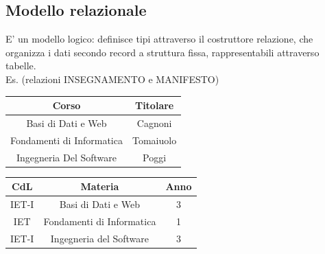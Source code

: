 \documentclass[../main.tex]{subfiles}
\begin{document}
	\subsection{Modello relazionale}
	E’ un modello logico: definisce tipi attraverso il costruttore relazione, che organizza i dati secondo record a struttura fissa, rappresentabili attraverso tabelle.\\
	Es. (relazioni INSEGNAMENTO e MANIFESTO)\\
	\begin{table}[ht]
		\begin{minipage}{.5\linewidth}
			\centering
			\begin{tabular}{ |c|c| }
				\hline
				\textbf{Corso} & \textbf{Titolare} \\
				\hline
				Basi di Dati e Web & Cagnoni \\
				Fondamenti di Informatica & Tomaiuolo\\
				Ingegneria Del Software & Poggi \\
				\hline
			\end{tabular}
		\end{minipage}
		\hfill
		\begin{minipage}{.5\linewidth}
			\centering
			\begin{tabular}{ |c|c|c| }
				\hline
				\textbf{CdL} & \textbf{Materia} & \textbf{Anno}\\
				\hline
				IET-I & Basi di Dati e Web & 3 \\
				IET & Fondamenti di Informatica& 1\\
				IET-I & Ingegneria del Software & 3\\
				\hline
			\end{tabular}
		\end{minipage}
	\end{table}
\end{document}
